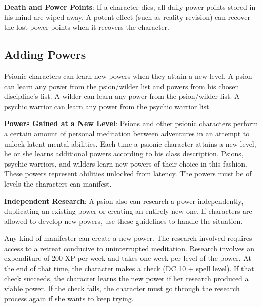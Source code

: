 \textbf{Death and Power Points}: If a character dies, all daily power points stored in his mind are wiped away. A potent effect (such as reality revision) can recover the lost power points when it recovers the character.

\subsection{Adding Powers}
Psionic characters can learn new powers when they attain a new level. A psion can learn any power from the psion/wilder list and powers from his chosen discipline's list. A wilder can learn any power from the psion/wilder list. A psychic warrior can learn any power from the psychic warrior list.

\textbf{Powers Gained at a New Level}: Psions and other psionic characters perform a certain amount of personal meditation between adventures in an attempt to unlock latent mental abilities. Each time a psionic character attains a new level, he or she learns additional powers according to his class description. Psions, psychic warriors, and wilders learn new powers of their choice in this fashion. These powers represent abilities unlocked from latency. The powers must be of levels the characters can manifest.

\textbf{Independent Research}: A psion also can research a power independently, duplicating an existing power or creating an entirely new one. If characters are allowed to develop new powers, use these guidelines to handle the situation.

Any kind of manifester can create a new power. The research involved requires access to a retreat conducive to uninterrupted meditation. Research involves an expenditure of 200 XP per week and takes one week per level of the power. At the end of that time, the character makes a  check (DC 10 + spell level). If that check succeeds, the character learns the new power if her research produced a viable power. If the check fails, the character must go through the research process again if she wants to keep trying.

